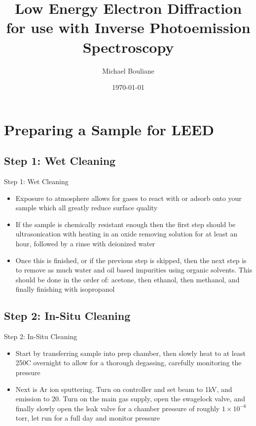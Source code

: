 \documentclass[11pt]{beamer}
\author{Michael Bouliane}
\title{Low Energy Electron Diffraction for use with Inverse Photoemission Spectroscopy}
\date{\today}
\begin{document}
\maketitle
\tableofcontents

\section{Preparing a Sample for LEED}

\subsection{Step 1: Wet Cleaning}

\begin{frame}{Step 1: Wet Cleaning}
    \begin{itemize}
        \item Exposure to atmosphere allows for gases to react with or adsorb onto your sample which all greatly reduce surface quality
        \item If the sample is chemically resistant enough then the first step should be ultrasonication with heating in an oxide removing solution for at least an hour, 
        followed by a rinse with deionized water
        \item Once this is finished, or if the previous step is skipped, then the next step is to remove as much water and oil based impurities using organic solvents. This should be done in the order of:
        acetone, then ethanol, then methanol, and finally finishing with isopropanol
    \end{itemize}
\end{frame}

\subsection{Step 2: In-Situ Cleaning}

\begin{frame}{Step 2: In-Situ Cleaning}
    \begin{itemize}
        \item Start by transferring sample into prep chamber, then slowly heat to at least 250C overnight to allow for a thorough degassing, carefully monitoring the pressure
        \item Next is Ar ion sputtering. Turn on controller and set beam to 1kV, and emission to 20. Turn on the main gas supply, open the swagelock valve, and finally slowly open the 
        leak valve for a chamber pressure of roughly $1\times 10^{-6}$ torr, let run for a full day and monitor pressure  
    \end{itemize}
\end{frame}
\end{document}
